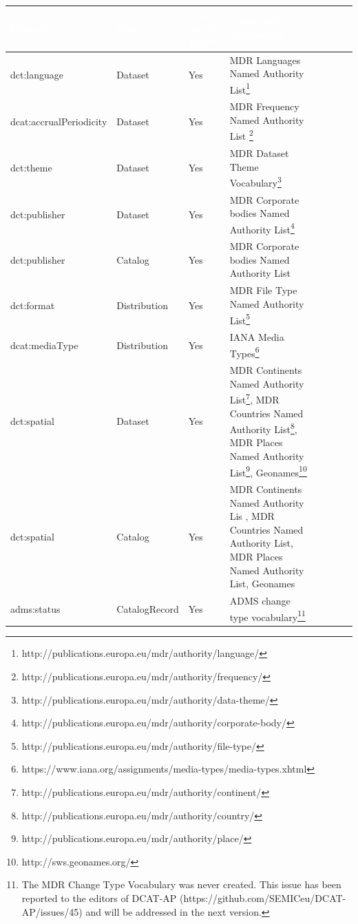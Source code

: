 \documentclass[<options>]{elsarticle}
\begin{document}
\begin{longtable}{*8l}
\rowcolor{blue!90}
\textcolor{white}{\textbf{Property}} & \textcolor{white}{\textbf{Class}} & \textcolor{white}{\textbf{Used on the EDP?}} & \textcolor{white}{\textbf{Controlled Vocabulary}} \\ \hline
\rowcolor{gray!10} dct:language&Dataset &Yes &MDR Languages Named Authority List\footnote{http://publications.europa.eu/mdr/authority/language/} \\ \hline
\rowcolor{gray!10} dcat:accrualPeriodicity&Dataset &Yes &MDR Frequency Named Authority List \footnote{http://publications.europa.eu/mdr/authority/frequency/}\\ \hline
\rowcolor{gray!10} dct:theme&Dataset &Yes &MDR Dataset Theme Vocabulary\footnote{http://publications.europa.eu/mdr/authority/data-theme/} \\ \hline
\rowcolor{gray!10} dct:publisher&Dataset &Yes &MDR Corporate bodies Named Authority List\footnote{http://publications.europa.eu/mdr/authority/corporate-body/} \\ \hline
\rowcolor{gray!10} dct:publisher&Catalog &Yes &MDR Corporate bodies Named Authority List \\ \hline
\rowcolor{gray!10} dct:format&Distribution &Yes &MDR File Type Named Authority List\footnote{http://publications.europa.eu/mdr/authority/file-type/}\\ \hline
\rowcolor{gray!10} dcat:mediaType&Distribution &Yes &IANA Media Types\footnote{https://www.iana.org/assignments/media-types/media-types.xhtml} \\ \hline
\rowcolor{gray!10} dct:spatial&Dataset &Yes &MDR Continents Named Authority List\footnote{http://publications.europa.eu/mdr/authority/continent/}, MDR Countries Named Authority List\footnote{http://publications.europa.eu/mdr/authority/country/}, MDR Places Named Authority List\footnote{http://publications.europa.eu/mdr/authority/place/}, Geonames\footnote{http://sws.geonames.org/} \\ \hline
\rowcolor{gray!10} dct:spatial&Catalog &Yes &MDR Continents Named Authority Lis , MDR Countries Named Authority List, MDR Places Named Authority List, Geonames \\ \hline
\rowcolor{gray!10} adms:status&CatalogRecord &Yes &ADMS change type vocabulary\footnote{The MDR Change Type Vocabulary was never created. This issue has been reported to the editors of DCAT-AP (https://github.com/SEMICeu/DCAT-AP/issues/45) and will be addressed in the next version.} \\ \hline

\end{longtable}
\end{document}
